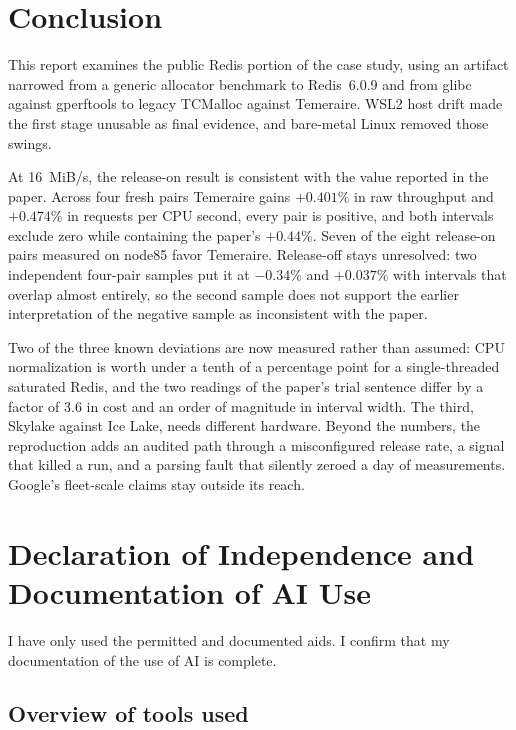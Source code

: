 \documentclass[sigconf]{acmart}
\begin{document}
\section{Conclusion}
\label{sec:conclusion}

This report examines the public Redis portion of the case study, using an
artifact narrowed
from a generic allocator benchmark to Redis~6.0.9 and from glibc against
gperftools to legacy TCMalloc against Temeraire. WSL2 host drift made the
first stage unusable as final evidence, and bare-metal Linux removed those
swings.

At 16~MiB/s, the release-on result is consistent with the value reported in the
paper. Across four fresh pairs Temeraire
gains $+0.401\%$ in raw throughput and $+0.474\%$ in requests per CPU second,
every pair is positive, and both intervals exclude zero while containing the
paper's $+0.44\%$. Seven of the eight release-on pairs measured on node85
favor Temeraire. Release-off stays unresolved: two independent four-pair
samples put it at $-0.34\%$ and $+0.037\%$ with intervals that overlap almost
entirely, so the second sample does not support the earlier interpretation of
the negative sample as inconsistent with the paper.

Two of the three known deviations are now measured rather than assumed: CPU
normalization is worth under a tenth of a percentage point for a single-threaded saturated Redis, and the two readings of the paper's trial sentence
differ by a factor of 3.6 in cost and an order of magnitude in interval width.
The third, Skylake against Ice Lake, needs different hardware. Beyond the
numbers, the reproduction adds an audited path through a misconfigured release
rate, a signal that killed a run, and a parsing fault that silently zeroed a
day of measurements. Google's fleet-scale claims stay
outside its reach.

\section*{Declaration of Independence and Documentation of AI Use}

I have only used the permitted and documented aids. I confirm that my
documentation of the use of AI is complete.

\subsection*{Overview of tools used}
\end{document}
